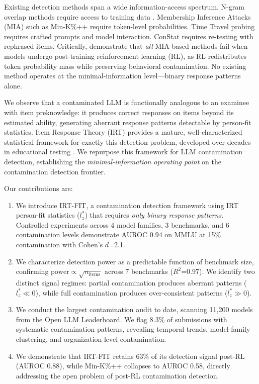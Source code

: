 \documentclass[11pt,a4paper]{article}
\begin{document}
Existing detection methods span a wide information-access spectrum.
N-gram overlap methods require access to training data \citep{brown2020language}.
Membership Inference Attacks (MIA) such as Min-K\%++ \citep{shi2024detecting} require token-level probabilities.
Time Travel probing \citep{golchin2024time} requires crafted prompts and model interaction.
ConStat \citep{dekoninck2024constat} requires re-testing with rephrased items.
Critically, \citet{wang2025contamination} demonstrate that \emph{all} MIA-based methods fail when models undergo post-training reinforcement learning (RL), as RL redistributes token probability mass while preserving behavioral contamination.
No existing method operates at the minimal-information level---binary response patterns alone.

We observe that a contaminated LLM is functionally analogous to an examinee with item preknowledge: it produces correct responses on items beyond its estimated ability, generating aberrant response patterns detectable by person-fit statistics.
Item Response Theory (IRT) provides a mature, well-characterized statistical framework for exactly this detection problem, developed over decades in educational testing \citep{drasgow1985appropriateness,meijer1996person}.
We repurpose this framework for LLM contamination detection, establishing the \emph{minimal-information operating point} on the contamination detection frontier.

Our contributions are:
\begin{enumerate}
\item We introduce \textsc{IRT-FIT}, a contamination detection framework using IRT person-fit statistics ($l_{z}^{*}$) that requires \emph{only binary response patterns}. Controlled experiments across 4 model families, 3 benchmarks, and 6 contamination levels demonstrate AUROC 0.94 on MMLU at 15\% contamination with Cohen's $d$=2.1.
\item We characterize detection power as a predictable function of benchmark size, confirming $\text{power} \propto \sqrt{n_{\text{items}}}$ across 7 benchmarks ($R^{2}$=0.97). We identify two distinct signal regimes: partial contamination produces aberrant patterns ($l_{z}^{*} \ll 0$), while full contamination produces over-consistent patterns ($l_{z}^{*} \gg 0$).
\item We conduct the largest contamination audit to date, scanning 11,200 models from the Open LLM Leaderboard. We flag 8.3\% of submissions with systematic contamination patterns, revealing temporal trends, model-family clustering, and organization-level contamination.
\item We demonstrate that IRT-FIT retains 63\% of its detection signal post-RL (AUROC 0.88), while Min-K\%++ collapses to AUROC 0.58, directly addressing the open problem of post-RL contamination detection.
\end{enumerate}
\end{document}
